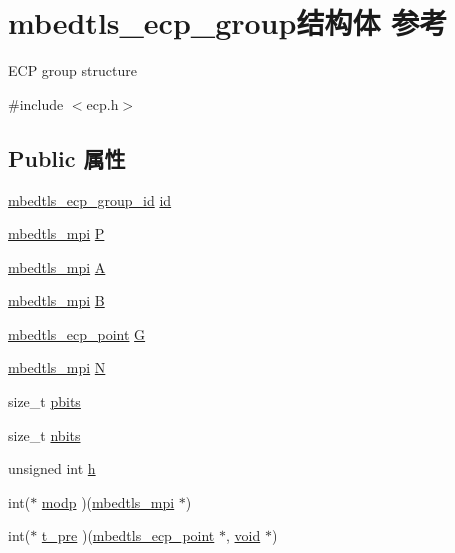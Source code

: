 \hypertarget{structmbedtls__ecp__group}{}\section{mbedtls\+\_\+ecp\+\_\+group结构体 参考}
\label{structmbedtls__ecp__group}


E\+CP group structure  




{\ttfamily \#include $<$ecp.\+h$>$}

\subsection*{Public 属性}
\begin{DoxyCompactItemize}
\item 
\hyperlink{ecp_8h_af79e530ea8f8416480f805baa20b1a2d}{mbedtls\+\_\+ecp\+\_\+group\+\_\+id} \hyperlink{structmbedtls__ecp__group_a3e572cd2e40e1c23fc9a7a6aef7122d6}{id}
\item 
\hyperlink{structmbedtls__mpi}{mbedtls\+\_\+mpi} \hyperlink{structmbedtls__ecp__group_ae049e9c949bf5d30e71b4b31819f6007}{P}
\item 
\hyperlink{structmbedtls__mpi}{mbedtls\+\_\+mpi} \hyperlink{structmbedtls__ecp__group_af6ab87eb277c78f786ca58ed3fd78825}{A}
\item 
\hyperlink{structmbedtls__mpi}{mbedtls\+\_\+mpi} \hyperlink{structmbedtls__ecp__group_ab54c9e6b1807d5c10db76f7ebedd55f4}{B}
\item 
\hyperlink{structmbedtls__ecp__point}{mbedtls\+\_\+ecp\+\_\+point} \hyperlink{structmbedtls__ecp__group_a7e0aca0789ca8f5c38d3a0c98b2f9809}{G}
\item 
\hyperlink{structmbedtls__mpi}{mbedtls\+\_\+mpi} \hyperlink{structmbedtls__ecp__group_a7104724a939b7eef2ae3627db410e1e8}{N}
\item 
size\+\_\+t \hyperlink{structmbedtls__ecp__group_a039ad9e51dc52e46a422e74051b2b837}{pbits}
\item 
size\+\_\+t \hyperlink{structmbedtls__ecp__group_aee5ef1a30d9a5e34810c7a9a7120a10b}{nbits}
\item 
unsigned int \hyperlink{structmbedtls__ecp__group_a3cc458ace9f663e7827a6c3556e75e64}{h}
\item 
int($\ast$ \hyperlink{structmbedtls__ecp__group_ad828ec2b9dcccb7664744fa5b69f561f}{modp} )(\hyperlink{structmbedtls__mpi}{mbedtls\+\_\+mpi} $\ast$)
\item 
int($\ast$ \hyperlink{structmbedtls__ecp__group_a2a4fbe0909b4feb994eaac95e1281cc6}{t\+\_\+pre} )(\hyperlink{structmbedtls__ecp__point}{mbedtls\+\_\+ecp\+\_\+point} $\ast$, \hyperlink{interfacevoid}{void} $\ast$)

\end{DoxyCompactItemize}
